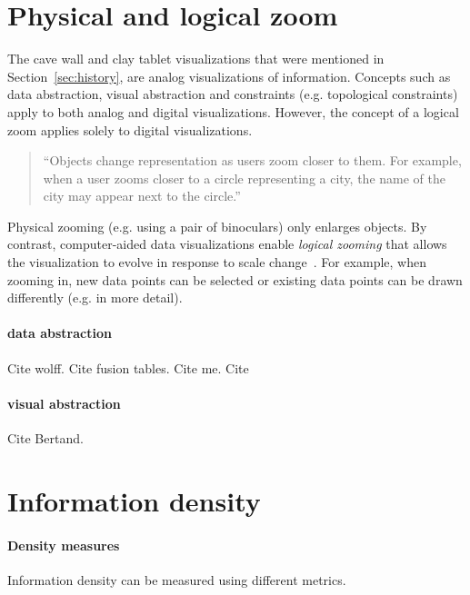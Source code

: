 \documentclass[11pt, oneside]{report}   	%
\begin{document}
\section{Physical and logical zoom}

The cave wall and clay tablet visualizations that were mentioned in Section~\ref{sec:history}, are analog visualizations of information. Concepts such as data abstraction, visual abstraction and constraints (e.g. topological constraints) apply to both analog and digital visualizations. However, the concept of a logical zoom applies solely to digital visualizations. 




\begin{quote}
``Objects change representation as users zoom closer to them. For example, when a user zooms closer to a circle representing a city, the name of the city may appear next to the circle.''
\end{quote}

Physical zooming (e.g. using a pair of binoculars) only enlarges objects. By contrast, computer-aided data visualizations enable \emph{logical zooming} that allows the visualization to evolve in response to scale change~\cite{van1990reactive}. For example, when zooming in, new data points can be selected or existing data points can be drawn differently (e.g. in more detail).

\paragraph{data abstraction}

Cite wolff. Cite fusion tables. Cite me. Cite 

\paragraph{visual abstraction}

Cite Bertand.

\section{Information density}

\paragraph{Density measures}

Information density can be measured using different metrics.
\end{document}
